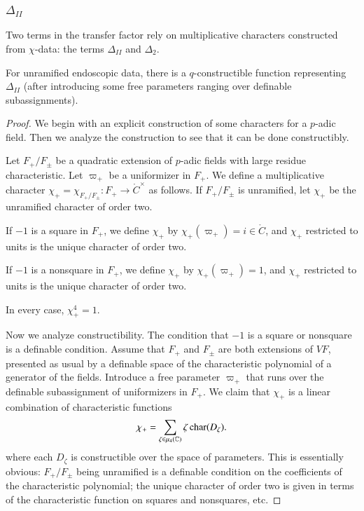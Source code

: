 \subsubsection{$\Delta_{II}$}
Two terms in the transfer factor rely on multiplicative characters
constructed from $\chi$-data: the terms $\Delta_{II}$ and 
$\Delta_2$.

\begin{lemma}  
  For unramified endoscopic data,
  there is a $q$-constructible function representing $\Delta_{II}$
  (after introducing some free parameters ranging over definable
  subassignments).
\end{lemma}

\begin{proof}  
  We begin with an explicit construction of some characters for a
  $p$-adic field.  Then we analyze the construction to see that it can
  be done constructibly.

  Let $F_+/F_\pm$ be a quadratic extension of $p$-adic fields with
  large residue characteristic.  Let
  $\varpi_+$ be a uniformizer in $F_+$.  We define a multiplicative
  character $\chi_+ = \chi_{F_+/F_{\pm}}:F_+\to \ring{C}^\times$ as
  follows.  If $F_+/F_\pm$ is unramified, let $\chi_+$ be the
  unramified character of order two.

  If $-1$ is a square in $F_+$, we define $\chi_+$ by
  $\chi_+(\varpi_+) = i\in\ring{C}$, and $\chi_+$ restricted to units
  is the unique character of order two.

  If $-1$ is a nonsquare in $F_+$, we define $\chi_+$ by
  $\chi_+(\varpi_+)=1$, and $\chi_+$ restricted to units is the unique
  character of order two.

  In every case, $\chi_+^4 = 1$.

  Now we analyze constructibility.  The condition that $-1$ is a
  square or nonsquare is a definable condition.  Assume that $F_+$ and
  $F_\pm$ are both extensions of $VF$, presented as usual by a
  definable space of the characteristic polynomial of a generator of
  the fields.  Introduce a free parameter $\varpi_+$ that runs over
  the definable subassignment of uniformizers in $F_+$.  We claim
  that $\chi_+$ is a linear combination of characteristic functions
\[
\chi_+ = \sum_{\zeta\in\mu_4(\mathbb{C})} \zeta\, {\operatorname{char}}(D_\zeta).
\]
where each $D_\zeta$ is constructible over the space of parameters.
This is essentially obvious: $F_+/F_\pm$ being unramified is a
definable condition on the coefficients of the characteristic
polynomial; the unique character of order two is given in terms of the
characteristic function on squares and nonsquares, etc.


\end{proof}
